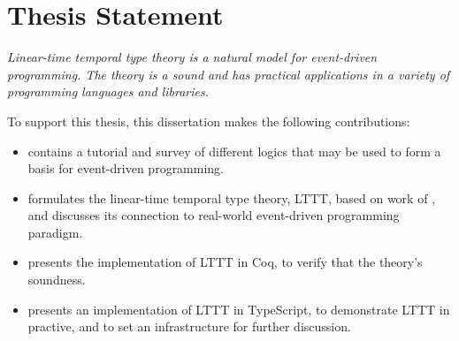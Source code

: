 \section{Thesis Statement}
\textit{Linear-time temporal type theory is a natural model for event-driven programming. The theory is a sound and has practical applications in a variety of programming languages and libraries.}

To support this thesis, this dissertation makes the following contributions:

\begin{itemize}
    \item {} contains a tutorial and survey of different logics that may be used to form a basis for event-driven programming.
    \item {} formulates the linear-time temporal type theory, LTTT, based on work of \cite{Paykin2016TheEO}, and discusses its connection to real-world event-driven programming paradigm.
    \item {} presents the implementation of LTTT in Coq, to verify that the theory's soundness.
    \item {} presents an implementation of LTTT in TypeScript, to demonstrate LTTT in practive, and to set an infrastructure for further discussion.
\end{itemize}